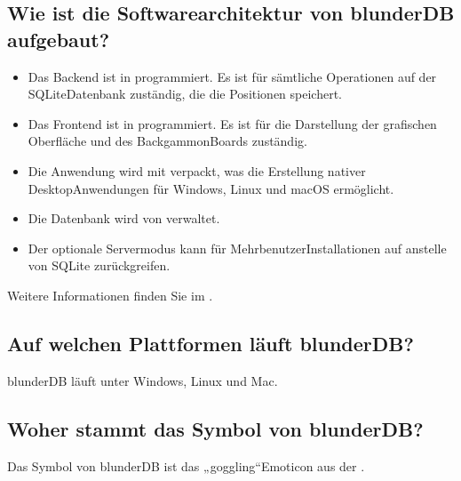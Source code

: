 \documentclass[letterpaper,10pt,german]{sphinxmanual}
\begin{document}
\subsection{Wie ist die Softwarearchitektur von blunderDB aufgebaut?}
\label{\detokenize{faq:quel-est-l-architecture-logicielle-de-blunderdb}}\begin{itemize}
\item {} 
\sphinxAtStartPar
Das Backend ist in  programmiert. Es ist für sämtliche Operationen auf der SQLite\sphinxhyphen{}Datenbank zuständig, die die Positionen speichert.

\item {} 
\sphinxAtStartPar
Das Frontend ist in  programmiert. Es ist für die Darstellung der grafischen Oberfläche und des Backgammon\sphinxhyphen{}Boards zuständig.

\item {} 
\sphinxAtStartPar
Die Anwendung wird mit  verpackt, was die Erstellung nativer Desktop\sphinxhyphen{}Anwendungen für Windows, Linux und macOS ermöglicht.

\item {} 
\sphinxAtStartPar
Die Datenbank wird von  verwaltet.

\item {} 
\sphinxAtStartPar
Der optionale Servermodus kann für Mehrbenutzer\sphinxhyphen{}Installationen auf  anstelle von SQLite zurückgreifen.

\end{itemize}

\sphinxAtStartPar
Weitere Informationen finden Sie im .


\subsection{Auf welchen Plattformen läuft blunderDB?}
\label{\detokenize{faq:sur-quelles-plateformes-blunderdb-fonctionne-t-il}}
\sphinxAtStartPar
blunderDB läuft unter Windows, Linux und Mac.


\subsection{Woher stammt das Symbol von blunderDB?}
\label{\detokenize{faq:d-ou-vient-l-icone-de-blunderdb}}
\sphinxAtStartPar
Das Symbol von blunderDB ist das „goggling“\sphinxhyphen{}Emoticon aus der .
\end{document}
